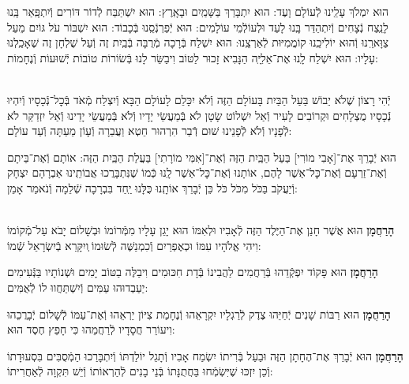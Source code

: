 \documentclass[twoside, openany, parskip=half, 11pt]{book}
\begin{document}
\begin{sometimes}
הוּא יִמְלֹךְ עָלֵֽינוּ לְֿעוֹלָם וָעֶד:
הוּא יִתְבָּרַךְ בַּשָּׁמַֽיִם וּבָאָֽרֶץ:
הוּא יִשְׁתַּבַּח לְֿדוֹר דּוֹרִים וְֿיִתְפָּֽאַר בָּֽנוּ לָנֵֽצַח נְֿצָחִים
וְֿיִתְהַדַּר בָּֽנוּ לָעַד וּלְעוֹלְֿמֵי עוֹלָמִים:
הוּא יְֿפַרְנְֿסֵֽנוּ בְּֿכָבוֹד:
הוּא יִשְׁבּוֹר עֹל גּוֹיִם מֵעַל צַוָּארֵֽנוּ וְֿהוּא יוֹלִיכֵֽנוּ קוֹמֲמִיּוּת לְֿאַרְצֵֽנוּ:
הוּא יִשְׁלַח בְּֿרָכָה מְֿרֻבָּה בְּֿבַֽיִת זֶה וְֿעַל שֻׁלְחָן זֶה שֶׁאָכַֽלְנוּ עָלָיו:
הוּא יִשְׁלַח לָֽנוּ אֶת־אֵלִיָּֽה הַנָּבִיא זָכוּר לַטּוֹב וִיבַשֵּׂר לָנוּ בְּֿשׂוֹרוֹת טוֹבוֹת יְֿשׁוּעוֹת וְֿנֶחָמוֹת:


\begin{footnotesize}
\\
יְֿהִי רָצוֹן שֶׁלֹא יֵבוֹשׁ בַּעַל הַבַּיִת בָּעוֹלָם הַזֶּה וְֿלֹא יִכָּלֵם לָעוֹלָם הַבָּא וְֿיִצְלַח מְֿאֹד בְּֿכׇל־נְֿכָסָיו וְֿיִהְיוּ נְֿכָסָיו מֻצְלָחִים וּקְרוֹבִים לָעִיר וְֿאַל יִשְׁלוֹט שָׂטָן לֹא בְּֿמַעֲשֵׂי יָדָיו וְֿלֹא בְּֿמַעֲשֵׂי יָדֵינוּ וְֿאַל יִזְדַקֵּר לֹא לְֿפָנָיו וְֿלֹא לְֿפָנֵינוּ שׁוּם דְֿבַר הִרְהוּר חֵטְא וַעֲבֵרָה וְֿעָוֹן מֵעַתָּה וְֿעַד עוֹלָם:

\end{footnotesize}

הוּא יְֿבָרֵךְ אֶת־[אָבִי מוֹרִי] בַּעַל הַבַּֽיִת הַזֶּה וְֿאֶת־[אִמִּי מוֹרָתִי] בַּעֲלַת הַבַּֽיִת הַזֶּה: אוֹתָם וְֿאֶת־בֵּיתָם וְֿאֶת־זַרְעָם וְֿאֶת־כׇּל־אַשֶׁר לָהֶם, אוֹתָנוּ וְֿאֶת־כׇּל־אַשֶׁר לָֽנוּ כְּֿמוֹ שֶׁנִּתְבָּרֲכוּ אֲבוֹתֵֽינוּ אַבְרָהָם יִצְחָק וְֿיַעֲקֹב בַּכֹּל מִכֹּל כֹּל כֵּן יְֿבָרֵךְ אוֹתָֽנוּ כֻּלָּנוּ יַֽחַד בִּבְרָכָה שְֿׁלֵמָה וְֿנֹאמַר אָמֵן:

\begin{sometimes}

\\
\textbf{הָרַחֲמָן}
הוּא אֲשֶׁר חָנַן אֶת־הַיֶּלֶד הַזֶּה לְֿאָבִיו וּלְאִמּוֹ הוּא יָגֵן עָלָיו מִמְּֿרוֹמוֹ וּבְשָׁלוֹם יָבֹא עַל־מְֿקוֹמוֹ וִיהִי אֱלֹהָיו עִמּוֹ וּכְאֶפְרַיִם וְֿכִמְנַשֶּׁה לְֿשׂוּמוֹ ְויִקָּרֵא בְֿיִשְׂרָאֵל שְֿׁמוֹ:

\textbf{הָרַחֲמָן}
הוּא פָּקוֹד יִפְקְֿדֵהוּ בְּֿרַחֲמִים לַהֲבִינוֹ בְּֿדָת חִכּוּמִים וִיבַלֶּה בַטּוֹב יָמִים וּשְׁנוֹתָיו בַּנְּֿעִימִים יַעַבְדוּהוּ עַמִּים וְֿיִשְׁתַּחֲווּ לוֹ לְֿאֻמִּים:

\textbf{הָרַחֲמָן}
הוּא רַבּוֹת שָׁנִים יְֿחַיֵּהוּ צֶדֶק לְֿרַגְלָיו יִקְרָאֵהוּ וְֿנֶחָמַת צִיּוֹן יַרְאֵהוּ וְֿאֶת־עַמּוֹ לְֿשָׁלוֹם יְֿבָרֲכֵהוּ וִיעוֹרֵר חֲסָדָיו לְֿרַחֲמֵהוּ כִּי חָפֵץ חֶסֶד הוּא:

\textbf{הָרַחֲמָן}
הוּא יְֿבָרֵךְ אֶת־הֶחָתָן הַזֶּה וּבַעַל בְּֿרִיתוֹ יִשְׂמַח אָבִיו וְֿתָגֵל יוֹלַדְתּוֹ וְֿיִתְבָּרַכוּ הַמְֿסֻבִּים בִּסְעוּדָתוֹ וְֿכֵן יִזְכּוּ שֶׁיִּשְׂמְֿחוּ בַּחֲתֻנָּתוֹ בְּֿנֵי בָנִים לְֿהַרְאוֹתוֹ וְֿיֵשׁ תִּקְוָה לְֿאַחֲרִיתוֹ:


\end{sometimes}
\end{sometimes}
\end{document}

